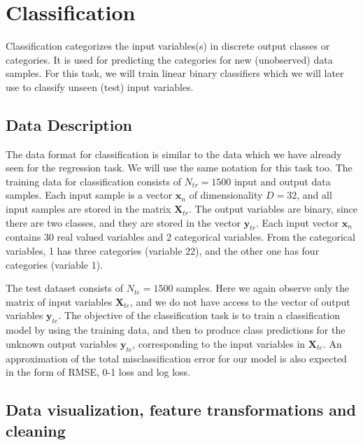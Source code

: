 \documentclass{article} %
\begin{document}

\section{Classification}

Classification categorizes the input variables(s) in discrete output classes or categories. It is used for predicting the categories for new (unobserved) data samples. For this task, we will train linear binary classifiers which we will later use to classify unseen (test) input variables.

\subsection{Data Description}

The data format for classification is similar to the data which we have already seen for the regression task. We will use the same notation for this task too. The training data for classification consists of $N_{tr}=1500$ input and output data samples. Each input sample is a vector $\mathbf{x}_n$ of dimensionality $D=32$, and all input samples are stored in the matrix $\mathbf{X}_{tr}$. The output variables are binary, since there are two classes, and they are stored in the vector $\mathbf{y}_{tr}$. Each input vector $\mathbf{x}_n$ contains 30 real valued variables and 2 categorical variables. From the categorical variables, 1 has three categories (variable 22), and the other one has four categories (variable 1).

The test dataset consists of $N_{te}=1500$ samples. Here we again observe only the matrix of input variables $\mathbf{X}_{te}$, and we do not have access to the vector of output variables $\mathbf{y}_{te}$. The objective of the classification task is to train a classification model by using the training data, and then to produce class predictions for the unknown output variables $\mathbf{y}_{te}$, corresponding to the input variables in $\mathbf{X}_{te}$. An approximation of the total misclassification error for our model is also expected in the form of RMSE, 0-1 loss and log loss.

\subsection{Data visualization, feature transformations and cleaning}
\end{document}
